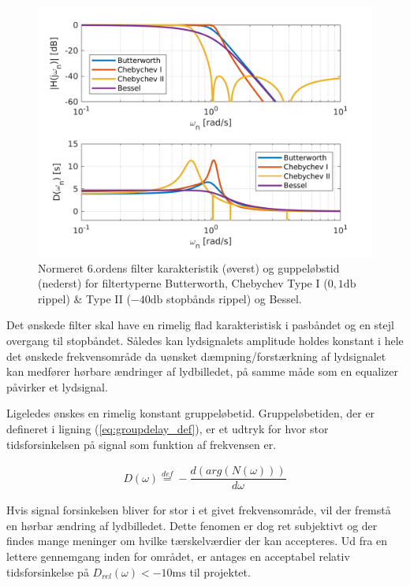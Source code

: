 \begin{figure}[h!]
	\centering
	\includegraphics[width=1\textwidth]{matlab/filter_compare.png}
	\caption{Normeret 6.ordens filter karakteristik (øverst) og guppeløbstid (nederst) for filtertyperne Butterworth, Chebychev Type I ($0,1 \si{\decibel}$ rippel) \& Type II ($-40 \si{\decibel}$ stopbånds rippel) og Bessel.}
	\label{fig:filter_typer}
\end{figure}

Det ønskede filter skal have en rimelig flad karakteristisk i pasbåndet og en stejl overgang til stopbåndet.
Således kan lydsignalets amplitude holdes konstant i hele det ønskede frekvensområde da uønsket dæmpning/forstærkning af lydsignalet kan medfører hørbare ændringer af lydbilledet, på samme måde som en equalizer påvirker et lydsignal. 

Ligeledes ønskes en rimelig konstant gruppeløbetid. 
Gruppeløbetiden, der er defineret i ligning (\ref{eq:groupdelay_def})\cite{anfilter}, er et udtryk for hvor stor tidsforsinkelsen på signal som funktion af frekvensen er.

\begin{align}
	D(\omega) \stackrel{def}{=} - \dfrac{d(arg(N(\omega)))}{d\omega}\label{eq:groupdelay_def}
\end{align}

Hvis signal forsinkelsen bliver for stor i et givet frekvensområde, vil der fremstå en hørbar ændring af lydbilledet.
Dette fenomen er dog ret subjektivt og der findes mange meninger om hvilke tærskelværdier der kan accepteres.
Ud fra en lettere gennemgang inden for området, er antages en acceptabel relativ tidsforsinkelse på $D_{rel}(\omega) < -10 \si{\milli\second}$ til projektet.   

